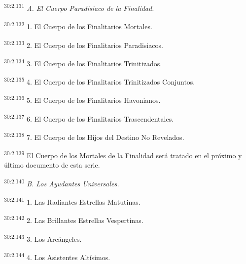 \par
\textsuperscript{30:2.131} \textit{A. El Cuerpo Paradisiaco de la Finalidad.}

\par
\textsuperscript{30:2.132} 1. El Cuerpo de los Finalitarios Mortales.

\par
\textsuperscript{30:2.133} 2. El Cuerpo de los Finalitarios Paradisiacos.

\par
\textsuperscript{30:2.134} 3. El Cuerpo de los Finalitarios Trinitizados.

\par
\textsuperscript{30:2.135} 4. El Cuerpo de los Finalitarios Trinitizados Conjuntos.

\par
\textsuperscript{30:2.136} 5. El Cuerpo de los Finalitarios Havonianos.

\par
\textsuperscript{30:2.137} 6. El Cuerpo de los Finalitarios Trascendentales.

\par
\textsuperscript{30:2.138} 7. El Cuerpo de los Hijos del Destino No Revelados.

\par
\textsuperscript{30:2.139} El Cuerpo de los Mortales de la Finalidad será tratado en el próximo y último documento de esta serie.

\par
\textsuperscript{30:2.140} \textit{B. Los Ayudantes Universales.}

\par
\textsuperscript{30:2.141} 1. Las Radiantes Estrellas Matutinas.

\par
\textsuperscript{30:2.142} 2. Las Brillantes Estrellas Vespertinas.

\par
\textsuperscript{30:2.143} 3. Los Arcángeles.

\par
\textsuperscript{30:2.144} 4. Los Asistentes Altísimos.

